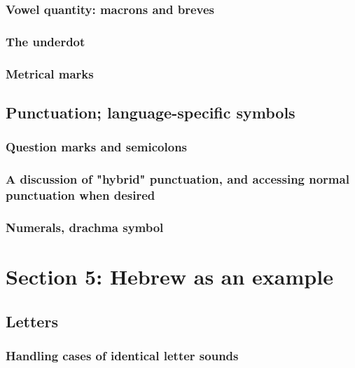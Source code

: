 \documentclass[11pt]{article}
\begin{document}
\subsubsection{Vowel quantity: macrons and breves}
\label{sec:org328380f}

\subsubsection{The underdot}
\label{sec:org35bb5f9}

\subsubsection{Metrical marks}
\label{sec:orgee22b91}

\subsection{Punctuation; language-specific symbols}
\label{sec:orgc32cb93}

\subsubsection{Question marks and semicolons}
\label{sec:orgdb48952}

\subsubsection{A discussion of "hybrid" punctuation, and accessing normal punctuation when desired}
\label{sec:orgfaa4454}

\subsubsection{Numerals, drachma symbol}
\label{sec:orgcdd362a}

\section{Section 5: Hebrew as an example}
\label{sec:orgf9f85b9}

\subsection{Letters}
\label{sec:org0a8f2aa}

\subsubsection{Handling cases of identical letter sounds}
\label{sec:orga3311b1}
\end{document}
